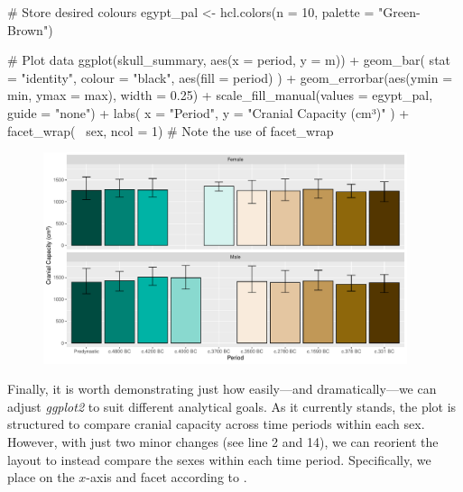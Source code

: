 \begin{inR}
# Store desired colours
egypt_pal <- hcl.colors(n = 10, palette = "Green-Brown")
\end{inR}

\clearpage

\begin{inRhigh}[highlightlines={14}]
# Plot data
ggplot(skull_summary, aes(x = period, y = m)) +
  geom_bar(
    stat = "identity",
    colour = "black",
    aes(fill = period)
  ) +
  geom_errorbar(aes(ymin = min, ymax = max), width = 0.25) +
  scale_fill_manual(values = egypt_pal, guide = "none") +
  labs(
    x = "Period",
    y = "Cranial Capacity (cm³)"
  ) +
  facet_wrap(~ sex, ncol = 1) # Note the use of facet_wrap
\end{inRhigh}

\vspace{2em}

\begin{figure}[H]
\includegraphics[width = 0.95\textwidth]{graphics/ch3Figs/bar_8.pdf}
\end{figure}

\clearpage

Finally, it is worth demonstrating just how easily—and dramatically—we can adjust \textit{ggplot2} to suit different analytical goals. As it currently stands, the plot is structured to compare cranial capacity across time periods within each sex. However, with just two minor changes (see line 2 and 14), we can reorient the layout to instead compare the sexes within each time period. Specifically, we place  on the $x$-axis and facet according to .


